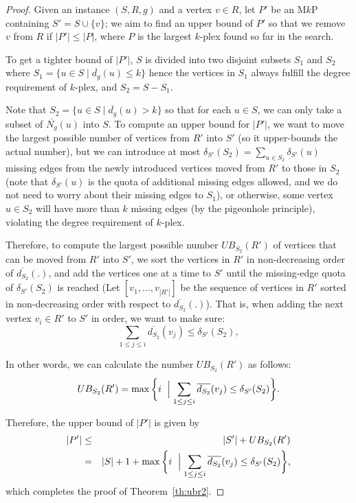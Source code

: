 \documentclass[sigconf, nonacm]{acmart}
\begin{document}
\begin{proof}
Given an instance $(S, R, g)$ and a vertex $v\in R$, let $P'$ be an M$k$P containing $S'=S\cup \{v\}$; we aim to find an upper bound of $P'$ so that we remove $v$ from $R$ if $|P'|\le |P|$, where $P$ is the largest $k$-plex found so far in the search. 

To get a tighter bound of $|P'|$, $S$ is divided into two disjoint subsets $S_1$ and $S_2$ where $S_1=\{u\in S \mid \overline{d_g}(u)\le k\}$ hence the vertices in $S_1$ always fulfill the degree requirement of $k$-plex, and $S_2=S-S_1$.

Note that $S_2=\{u\in S \mid \overline{d_g}(u)> k\}$ so that for each $u\in S$, we can only take a subset of $\overline{N_g}(u)$ into $S$. To compute an upper bound for $|P'|$, we want to move the largest possible number of vertices from $R'$ into $S'$ (so it upper-bounds the actual number), but we can introduce at most $\delta_{S'}(S_2)=\sum_{u\in S_2}{\delta_{S'}(u)}$ missing edges from the newly introduced vertices moved from $R'$ to those in $S_2$ (note that $\delta_{S'}(u)$ is the quota of additional missing edges allowed, and we do not need to worry about their missing edges to $S_1$), or otherwise, some vertex $u\in S_2$ will have more than $k$ missing edges (by the pigeonhole principle), violating the degree requirement of $k$-plex.

Therefore, to compute the largest possible number $UB_{S_2}(R')$ of vertices that can be moved from $R'$ into $S'$, we sort the vertices in $R'$ in non-decreasing order of $ \overline{d_{S_2}}(.)$, and add the vertices one at a time to $S'$ until the missing-edge quota of $\delta_{S'}(S_2)$ is reached (Let $[v_1,\ldots, v_{|R'|}]$ be the sequence of vertices in $R'$ sorted in non-decreasing order with respect to $\overline{d_{S_2}}(.)$). That is, when adding the next vertex $v_i\in R'$ to $S'$ in order, we want to make sure:
\begin{equation*}
  \sum_{1\le j\le i}\overline{d_{S_2}}(v_j)\le \delta_{S'}(S_2),
\end{equation*}

In other words, we can calculate the number $UB_{S_2}(R')$ as follows:
\begin{equation}\label{eq:ub_r'}
  UB_{S_2}(R') = \max\bigg\{i\ \Bigm| \sum_{1\le j\le i}\overline{d_{S_2}}(v_j)\le \delta_{S'}(S_2)\bigg\}.
\end{equation}

Therefore, the upper bound of $|P'|$ is given by
\begin{eqnarray}
  |P'| & \le & |S'| + UB_{S_2}(R')\nonumber\\
  & = & |S| + 1 +\max\bigg\{i\ \Bigm| \sum_{1\le j\le i}\overline{d_{S_2}}(v_j)\le \delta_{S'}(S_2)\bigg\}\label{eq:S2},
\end{eqnarray}
which completes the proof of Theorem~\ref{th:ubr2}.
\end{proof} 
\end{document}
